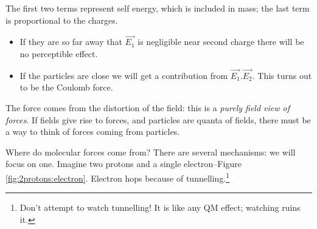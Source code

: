 \documentclass[]{article}
\begin{document}
The first two terms represent self energy, which is included in mass; the last term is proportional to the charges.
\begin{itemize}
	\item  If they are so far away that $\vec{E_1}$ is negligible near second charge there will be no perceptible effect.
	\item If the particles are close we will get a contribution from $\vec{E_1}.\vec{E_2}$. This turns out to be the Coulomb force. 
\end{itemize}

The force comes from the distortion of the field: this is a \emph{purely field view of forces}. If fields give rise to forces, and particles are quanta of fields, there must be a way to think of forces coming from particles.

Where do molecular forces come from? There are several mechanisms: we will focus on one. Imagine two protons and a single electron--Figure \ref{fig:2protons:electron}. Electron hops because of tunnelling.\footnote{Don't attempt to watch tunnelling! It is like any QM effect; watching ruins it.}
\end{document}
